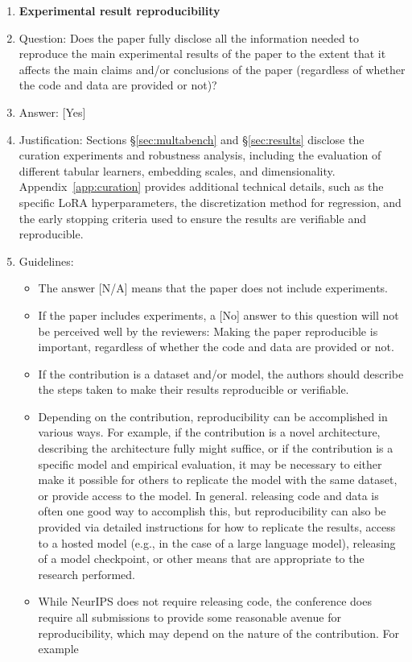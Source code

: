 \documentclass{llmxive}
\providecommand{\answerYes}[1][]{[Yes]#1}
\providecommand{\answerNo}[1][]{[No]#1}
\providecommand{\answerNA}[1][]{[N/A]#1}
\begin{document}
\begin{enumerate}
    \item {\bf Experimental result reproducibility}
    \item[] Question: Does the paper fully disclose all the information needed to reproduce the main experimental results of the paper to the extent that it affects the main claims and/or conclusions of the paper (regardless of whether the code and data are provided or not)?
    \item[] Answer: \answerYes{}
    \item[] Justification: Sections \S\ref{sec:multabench} and \S\ref{sec:results} disclose the curation experiments and robustness analysis, including the evaluation of different tabular learners, embedding scales, and dimensionality. Appendix~\ref{app:curation} provides additional technical details, such as the specific LoRA hyperparameters, the discretization method for regression, and the early stopping criteria used to ensure the results are verifiable and reproducible.
    \item[] Guidelines:
    \begin{itemize}
        \item The answer \answerNA{} means that the paper does not include experiments.
        \item If the paper includes experiments, a \answerNo{} answer to this question will not be perceived well by the reviewers: Making the paper reproducible is important, regardless of whether the code and data are provided or not.
        \item If the contribution is a dataset and\slash or model, the authors should describe the steps taken to make their results reproducible or verifiable. 
        \item Depending on the contribution, reproducibility can be accomplished in various ways. For example, if the contribution is a novel architecture, describing the architecture fully might suffice, or if the contribution is a specific model and empirical evaluation, it may be necessary to either make it possible for others to replicate the model with the same dataset, or provide access to the model. In general. releasing code and data is often one good way to accomplish this, but reproducibility can also be provided via detailed instructions for how to replicate the results, access to a hosted model (e.g., in the case of a large language model), releasing of a model checkpoint, or other means that are appropriate to the research performed.
        \item While NeurIPS does not require releasing code, the conference does require all submissions to provide some reasonable avenue for reproducibility, which may depend on the nature of the contribution. For example

\end{itemize}
\end{enumerate}
\end{document}
